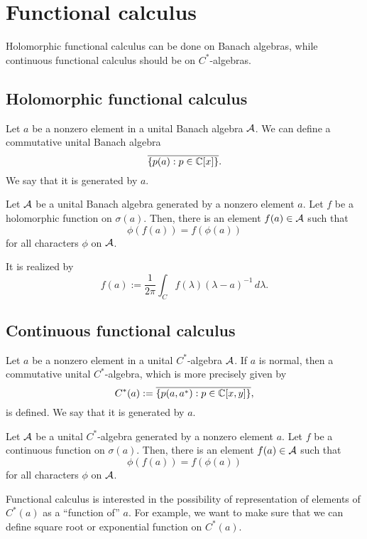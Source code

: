 \documentclass{../crs}
\begin{document}
\section{Functional calculus}

Holomorphic functional calculus can be done on Banach algebras, while continuous functional calculus should be on $C^*$-algebras.

\subsection{Holomorphic functional calculus}
Let $a$ be a nonzero element in a unital Banach algebra $\mathcal{A}$.
We can define a commutative unital Banach algebra
\[\overline{\{p(a):p\in\mathbb{C}[x]\}}.\]
We say that it is generated by $a$.

\begin{thm}
Let $\mathcal{A}$ be a unital Banach algebra generated by a nonzero element $a$.
Let $f$ be a holomorphic function on $\sigma(a)$.
Then, there is an element $f(a)\in\mathcal{A}$ such that
\[\phi(f(a))=f(\phi(a))\]
for all characters $\phi$ on $\mathcal{A}$.
\end{thm}
\begin{pf}
It is realized by
\[f(a):=\frac1{2\pi}\int_Cf(\lambda)(\lambda-a)^{-1}\,d\lambda.\]
\end{pf}

\begin{ex}

\end{ex}


\subsection{Continuous functional calculus}
Let $a$ be a nonzero element in a unital $C^*$-algebra $\mathcal{A}$.
If $a$ is normal, then a commutative unital $C^*$-algebra, which is more precisely given by
\[C^*(a):=\overline{\{p(a,a^*):p\in\mathbb{C}[x,y]\}},\]
is defined.
We say that it is generated by $a$.

\begin{thm}
Let $\mathcal{A}$ be a unital $C^*$-algebra generated by a nonzero element $a$.
Let $f$ be a continuous function on $\sigma(a)$.
Then, there is an element $f(a)\in\mathcal{A}$ such that
\[\phi(f(a))=f(\phi(a))\]
for all characters $\phi$ on $\mathcal{A}$.
\end{thm}

Functional calculus is interested in the possibility of representation of elements of $C^*(a)$ as a ``function of'' $a$.
For example, we want to make sure that we can define square root or exponential function on $C^*(a)$.
\end{document}
